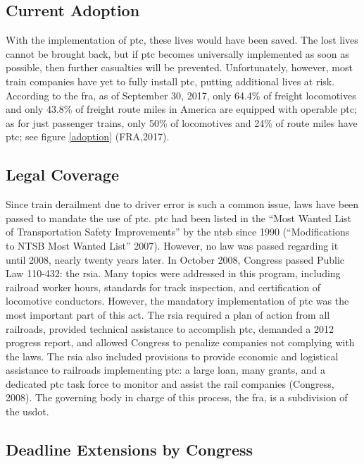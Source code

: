 \documentclass[11pt, titlepage]{article}
\begin{document}
\subsection{Current Adoption}

With the implementation of \gls{ptc}, these lives would have been saved. The lost
lives cannot be brought back, but if \gls{ptc} becomes universally implemented as
soon as possible, then further casualties will be prevented. Unfortunately,
however, most train companies have yet to fully install \gls{ptc}, putting
additional lives at risk. According to the \gls{fra}, as of September 30, 2017,
only 64.4\% of freight locomotives and only 43.8\% of freight route miles in
America are equipped with operable \gls{ptc}; as for just passenger trains, only
50\% of locomotives and 24\% of route miles have \gls{ptc}; see figure
\ref{adoption} (FRA,2017).


\subsection{Legal Coverage}

Since train derailment due to driver error is such a common issue, laws have been
passed to mandate the use of \gls{ptc}. \gls{ptc} had been listed in the ``Most
Wanted List of Transportation Safety Improvements'' by the \gls{ntsb} since 1990
(``Modifications to NTSB Most Wanted List'' 2007). However, no law was passed
regarding it until 2008, nearly twenty years later. In October 2008, Congress
passed Public Law 110-432: the \gls{rsia}. Many topics were addressed in this
program, including railroad worker hours, standards for track inspection, and
certification of locomotive conductors. However, the mandatory implementation of
\gls{ptc} was the most important part of this act. The \gls{rsia} required a plan
of action from all railroads, provided technical assistance to accomplish
\gls{ptc}, demanded a 2012 progress report, and allowed Congress to penalize
companies not complying with the laws. The \gls{rsia} also included provisions to
provide economic and logistical assistance to railroads implementing \gls{ptc}: a
large loan, many grants, and a dedicated \gls{ptc} task force to monitor and
assist the rail companies (Congress, 2008). The governing body in charge of this
process, the \gls{fra}, is a subdivision of the \gls{usdot}.

\subsection{Deadline Extensions by Congress}
\end{document}
